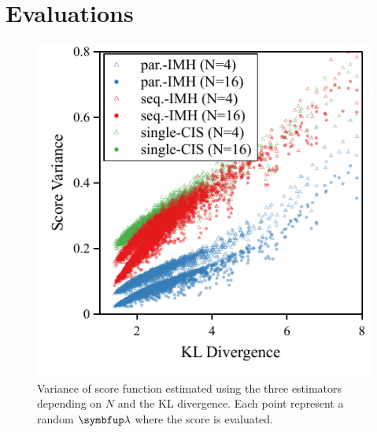 




\vspace{-0.05in}
\section{Evaluations}\label{section:eval}

\begin{figure}[t]
\centering
\includegraphics[scale=0.7]{figures/simulation_02.pdf}
\caption{Variance of score function estimated using the three estimators depending on \(N\) and the KL divergence.
Each point represent a random \(\vlambda\) where the score is evaluated.}\label{fig:simulation}
\end{figure}
%
\vspace{-0.05in}
